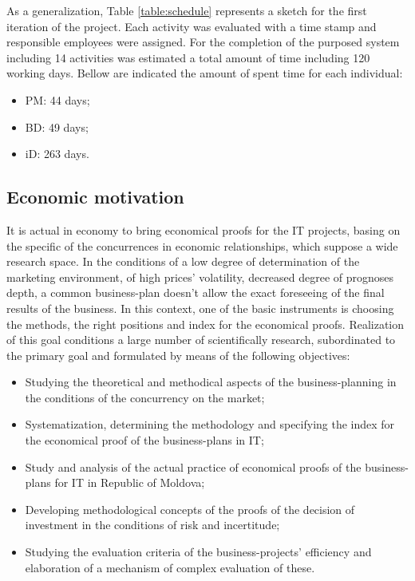 \documentclass[12pt,a4paper,titlepage]{article}
\begin{document}
 As a generalization, Table \ref{table:schedule} represents a sketch for the first iteration of the project. Each activity was evaluated with a time stamp and responsible employees were assigned. For the completion of the purposed system including 14 activities was estimated a total amount of time including 120 working days. Bellow are indicated the amount of spent time for each individual:
 \begin{itemize}
\item PM: 44 days; 
\item BD: 49 days;
\item iD: 263 days.
 \end{itemize}

\subsection{Economic motivation}
It is actual in economy to bring economical proofs for the IT projects, basing on the specific of the concurrences in economic relationships, which suppose a wide research space. In the conditions of a low degree of determination of the marketing environment, of high prices' volatility, decreased degree of prognoses depth, a common business-plan doesn't allow the exact foreseeing of the final results of the business. In this context, one of the basic instruments is choosing the methods, the right positions and index for the economical proofs.
Realization of this goal conditions a large number of scientifically research, subordinated to the primary goal and formulated by means of the following objectives:
\begin{itemize}
\item Studying the theoretical and methodical aspects of the business-planning in the conditions of the concurrency on the market;
\item  Systematization, determining the methodology and specifying the index for the economical proof of the business-plans in IT;
\item  Study and analysis of the actual practice of economical proofs of the business-plans for IT in Republic of Moldova;
\item  Developing methodological concepts of the proofs of the decision of investment in the conditions of risk and incertitude;
\item  Studying the evaluation criteria of the business-projects' efficiency and elaboration of a mechanism of complex evaluation of these.
\end{itemize}
\end{document}

